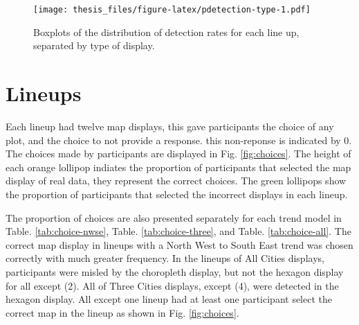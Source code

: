 \documentclass{monashthesis}
\begin{document}
\begin{figure}
\centering
\texttt{[image: thesis\_files/figure-latex/pdetection-type-1.pdf]}
\caption{\label{fig:pdetection-type}Boxplots of the distribution of detection rates for each line up, separated by type of display.}
\end{figure}

\hypertarget{lineups}{%
\section{Lineups}\label{lineups}}

Each lineup had twelve map displays, this gave participants the choice of any plot, and the choice to not provide a response. this non-reponse is indicated by 0.
The choices made by participants are displayed in Fig. \ref{fig:choices}. The height of each orange lollipop indiates the proportion of participants that selected the map display of real data, they represent the correct choices.
The green lollipops show the proportion of participants that selected the incorrect displays in each lineup.

The proportion of choices are also presented separately for each trend model in Table. \ref{tab:choice-nwse}, Table. \ref{tab:choice-three}, and Table. \ref{tab:choice-all}.
The correct map display in lineups with a North West to South East trend was chosen correctly with much greater frequency.
In the lineups of All Cities displays, participants were misled by the choropleth display, but not the hexagon display for all except (2).
All of Three Cities displays, except (4), were detected in the hexagon display. All except one lineup had at least one participant select the correct map in the lineup as shown in Fig. \ref{fig:choices}.
\end{document}
